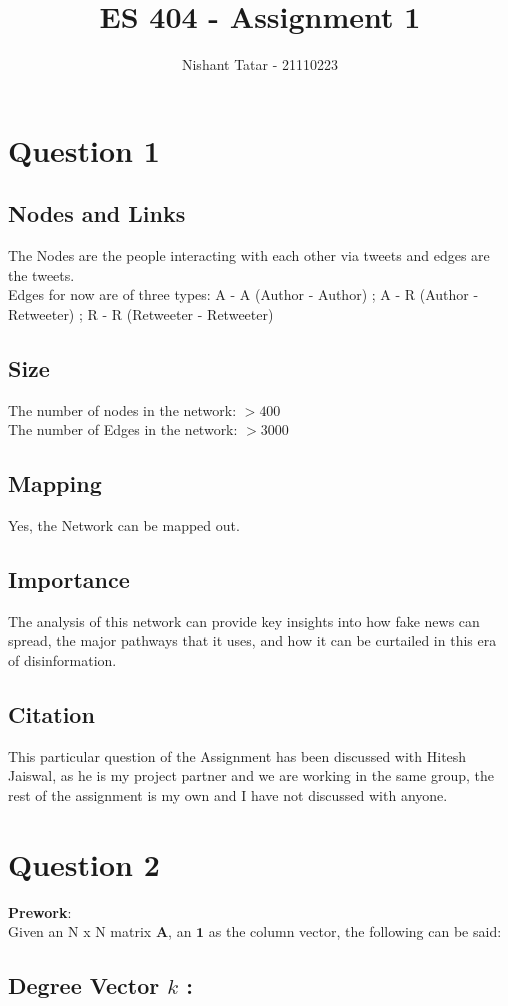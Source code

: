 \documentclass[11pt]{article}
\title{ES 404 - Assignment 1}
\date{}
\author{Nishant Tatar - 21110223}
\begin{document}
\maketitle

\section{Question 1}
\subsection{Nodes and Links}
The Nodes are the people interacting with each other via tweets and edges are the tweets.\\
Edges for now are of three types: A - A (Author - Author) ; A - R (Author - Retweeter) ; R - R (Retweeter - Retweeter)
\subsection{Size}
The number of nodes in the network: $>400$ \\
The number of Edges in the network: $>3000$ 
\subsection{Mapping}
Yes, the Network can be mapped out.
\subsection{Importance}
The analysis of this network can provide key insights into how fake news can spread, the major pathways that it uses, and how it can be curtailed in this era of disinformation.

\subsection{Citation}
This particular question of the Assignment has been discussed with Hitesh Jaiswal, as he is my project partner and we are working in the same group, the rest of the assignment is my own and I have not discussed with anyone.


\section{Question 2}
\textbf{Prework}: \\
Given an N x N matrix $\mathbf{A}$, an $\mathbf{1}$ as the column vector, the following can be said:

\subsection{Degree Vector $k$ :}
\end{document}
